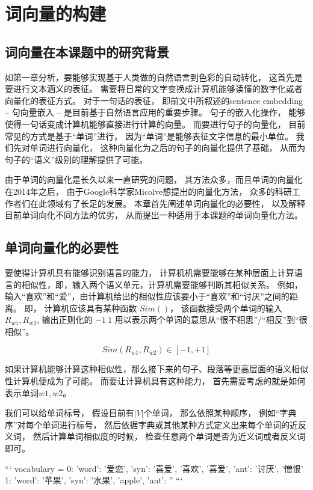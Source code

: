 \chapter{词向量的构建}

\section{词向量在本课题中的研究背景}


如第一章分析，要能够实现基于人类做的自然语言到色彩的自动转化， 这首先是要进行文本涵义的表征。 需要将日常的文字变换成计算机能够读懂的数字化或者向量化的表征方式。 对于一句话的表征， 即前文中所叙述的sentence embedding -- 句向量嵌入 -- 是目前基于自然语言应用的重要步骤。 句子的嵌入化操作， 能够使得一句话变成计算机能够直接进行计算的向量。  而要进行句子的向量化， 目前常见的方式是基于“单词”进行， 因为“单词”是能够表征文字信息的最小单位。 我们先对单词进行向量化， 这种向量化为之后的句子的向量化提供了基础， 从而为句子的“语义”级别的理解提供了可能。 

由于单词的向量化是长久以来一直研究的问题， 其方法众多，而且单词的向量化在2014年之后， 由于Google科学家Micolve想提出的向量化方法， 众多的科研工作者们在此领域有了长足的发展。 本章首先阐述单词向量化的必要性， 以及解释目前单词向化不同方法的优劣， 从而提出一种适用于本课题的单词向量化方法。 

\section{单词向量化的必要性}

要使得计算机具有能够识别语言的能力， 计算机机需要能够在某种层面上计算语言的相似性，即，输入两个语义单元，计算机需要能够判断其相似关系。 例如， 输入“喜欢”和“爱”，由计算机给出的相似性应该要小于“喜欢”和“讨厌”之间的距离。 即， 计算机应该具有某种函数 $Sim()$， 该函数接受两个单词的输入$R_{w1}, R_{w2}$, 输出正则化的 $ -1 ~ 1$ 用以表示两个单词的意思从“很不相思”/“相反”到“很相似”。 

$$ Sim(R_{w1}, R_{w2}) \in [-1, +1] $$

如果计算机能够计算这种相似性，那么接下来的句子、段落等更高层面的语义相似性计算机便成为了可能。 而要让计算机具有这种能力， 首先需要考虑的就是如何表示单词$w1, w2$。 

我们可以给单词标号， 假设目前有$|V|$个单词， 那么依照某种顺序， 例如“字典序”对每个单词进行标号， 然后依据字典或其他某种方式定义出来每个单词的近反义词， 然后计算单词相似度的时候， 检查任意两个单词是否为近义词或者反义词即可。 

```
	vocabulary = {
		0: {
			'word': '爱恋', 	
			'syn': '喜爱', '喜欢', '喜爱',
			'ant': '讨厌', '憎恨'
		   }
		1: {
			 'word': '苹果', 
			 'syn': '水果', 'apple',
			 'ant': ''
			}
	}
```

